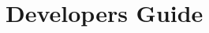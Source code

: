 \documentclass[a4paper]{scrreprt}
\begin{document}






\part{Developers Guide}




















\end{document}
